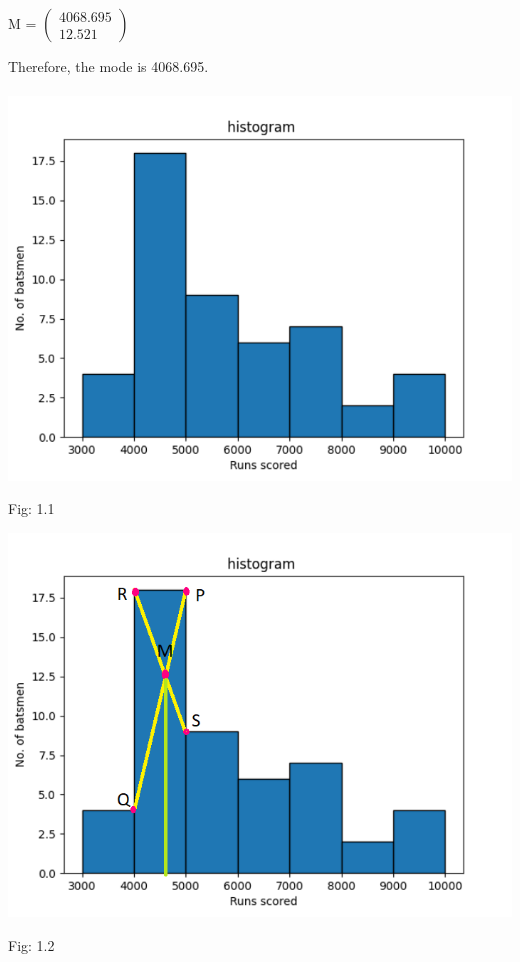 \documentclass[12pt, a4paper] {article}
\begin{document}
\begin{center}
M =
$\begin{pmatrix}
  4068.695\\
  12.521 
\end{pmatrix}$ 
\end{center}
Therefore, the mode is 4068.695.\\\\
\includegraphics{fig 1.1}
\begin{center}
Fig: 1.1\\
\end{center}

\includegraphics{fig 1.2}
\begin{center}
Fig: 1.2\\
\end{center}
\end{document}
